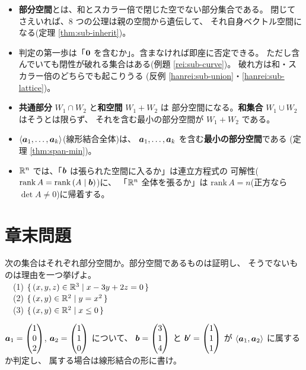 \begin{matome}
\begin{itemize}
\item \textbf{部分空間}とは、和とスカラー倍で閉じた空でない部分集合である。
閉じてさえいれば、$8$ つの公理は親の空間から遺伝して、
それ自身ベクトル空間になる(定理 \ref{thm:sub-inherit})。
\item 判定の第一歩は「$\bm{0}$ を含むか」。含まなければ即座に否定できる。
ただし含んでいても閉性が破れる集合はある(例題 \ref{rei:sub-curve})。
破れ方は和・スカラー倍のどちらでも起こりうる
(反例 \ref{hanrei:sub-union}・\ref{hanrei:sub-lattice})。
\item \textbf{共通部分} $W_1 \cap W_2$ と\textbf{和空間} $W_1 + W_2$ は
部分空間になる。\textbf{和集合} $W_1 \cup W_2$ はそうとは限らず、
それを含む最小の部分空間が $W_1 + W_2$ である。
\item $\langle \bm{a}_1, \dots, \bm{a}_k \rangle$(線形結合全体)は、
$\bm{a}_1, \dots, \bm{a}_k$ を含む\textbf{最小の部分空間}である
(定理 \ref{thm:span-min})。
\item $\mathbb{R}^n$ では、「$\bm{b}$ は張られた空間に入るか」は連立方程式の
可解性($\mathrm{rank}\,A = \mathrm{rank}\,(A \mid \bm{b})$)に、
「$\mathbb{R}^n$ 全体を張るか」は $\mathrm{rank}\,A = n$(正方なら
$\det A \neq 0$)に帰着する。
\end{itemize}
\end{matome}

\section*{章末問題}

\begin{mondai}[基本]\label{q:sub-ex1}
次の集合はそれぞれ部分空間か。部分空間であるものは証明し、
そうでないものは理由を一つ挙げよ。\\
　(1) $\{\, (x, y, z) \in \mathbb{R}^3 \mid x - 3y + 2z = 0 \,\}$\\
　(2) $\{\, (x, y) \in \mathbb{R}^2 \mid y = x^2 \,\}$\\
　(3) $\{\, (x, y) \in \mathbb{R}^2 \mid x \le 0 \,\}$
\end{mondai}

\begin{mondai}[基本]\label{q:sub-ex2}
$\bm{a}_1 = \begin{pmatrix}1 \\ 0 \\ 2\end{pmatrix}$, $\bm{a}_2 = \begin{pmatrix}1 \\ 1 \\ 0\end{pmatrix}$ について、
$\bm{b} = \begin{pmatrix}3 \\ 1 \\ 4\end{pmatrix}$ と $\bm{b}' = \begin{pmatrix}1 \\ 1 \\ 1\end{pmatrix}$ が
$\langle \bm{a}_1, \bm{a}_2 \rangle$ に属するか判定し、
属する場合は線形結合の形に書け。
\end{mondai}


